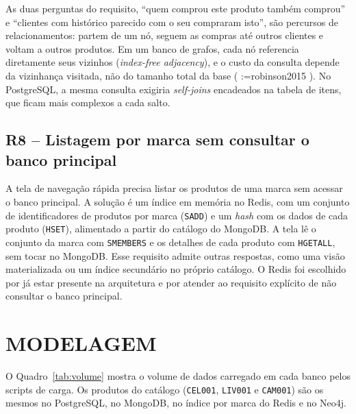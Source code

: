 \documentclass[12pt,a4paper,oneside]{article}
\makeatletter
\newcommand{\tys@getpar}[1]{%
  \@ifundefined{cite@#1}{\textbf{??#1??}}{\@nameuse{cite@#1}}%
}
\newif\iftysfirst
\newcommand{\tys@listpar}[1]{%
  \tysfirsttrue
  \@for\tys@key:=#1\do{%
    \iftysfirst\tysfirstfalse\else; \fi
    \expandafter\tys@getpar\expandafter{\tys@key}%
  }%
}
\renewcommand{\cite}[1]{(\tys@listpar{#1})}
\makeatother
\begin{document}
As duas perguntas do requisito, ``quem comprou este produto também comprou'' e ``clientes com histórico parecido com o seu compraram isto'', são percursos de relacionamentos: partem de um nó, seguem as compras até outros clientes e voltam a outros produtos. Em um banco de grafos, cada nó referencia diretamente seus vizinhos (\textit{index-free adjacency}), e o custo da consulta depende da vizinhança visitada, não do tamanho total da base \cite{robinson2015}. No PostgreSQL, a mesma consulta exigiria \textit{self-joins} encadeados na tabela de itens, que ficam mais complexos a cada salto.

\subsection{R8 -- Listagem por marca sem consultar o banco principal}

A tela de navegação rápida precisa listar os produtos de uma marca sem acessar o banco principal. A solução é um índice em memória no Redis, com um conjunto de identificadores de produtos por marca (\texttt{SADD}) e um \textit{hash} com os dados de cada produto (\texttt{HSET}), alimentado a partir do catálogo do MongoDB. A tela lê o conjunto da marca com \texttt{SMEMBERS} e os detalhes de cada produto com \texttt{HGETALL}, sem tocar no MongoDB. Esse requisito admite outras respostas, como uma visão materializada ou um índice secundário no próprio catálogo. O Redis foi escolhido por já estar presente na arquitetura e por atender ao requisito explícito de não consultar o banco principal.

\section{MODELAGEM}

O Quadro~\ref{tab:volume} mostra o volume de dados carregado em cada banco pelos scripts de carga. Os produtos do catálogo (\texttt{CEL001}, \texttt{LIV001} e \texttt{CAM001}) são os mesmos no PostgreSQL, no MongoDB, no índice por marca do Redis e no Neo4j.
\end{document}
